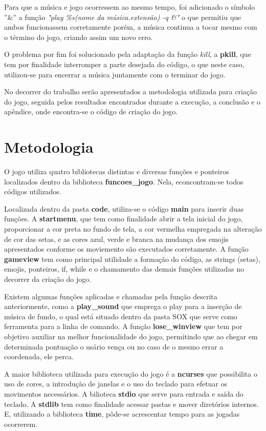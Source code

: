\documentclass[journal]{IEEEtran}
\begin{document}
Para que a música e jogo ocorressem ao mesmo tempo, foi adicionado o símbolo ''\&'' a função \textit{"play \%s(nome da música.extensão) -q \&"} o que permitiu que ambos funcionassem corretamente porém, a música continua a tocar mesmo com o término do jogo, criando assim um novo erro. 

O problema por fim foi solucionado pela adaptação da função \textit{kill}, a \textbf{pkill}, que tem por finalidade interromper a parte desejada do código, o que neste caso, utilizou-se para encerrar a música juntamente com o terminar do jogo. 

No decorrer do trabalho serão apresentados a metodologia utilizada para criação do jogo, seguida pelos resultados encontrados durante a execução, a conclusão e o apêndice, onde encontra-se o código de criação do jogo.


\section{Metodologia}
O jogo utiliza quatro bibliotecas distintas e diversas funções e ponteiros localizados dentro da biblioteca \textbf{funcoes\_jogo}. Nela, econcontram-se todos códigos utilizados. 

Localizada dentro da pasta \textbf{code}, utiliza-se o código \textbf{main} para inserir duas funções. A \textbf{startmenu}, que tem como finalidade abrir a tela inicial do jogo, proporcionar a cor preta no fundo de tela, a cor vermelha empregada na alteração de cor das setas, e as cores azul, verde e branca na mudança dos emojis apresentados conforme os moviemento são executados corretamente. A função \textbf{gameview} tem como principal utilidade a formação do código, as strings (setas), emojis, ponteiros, if, while e o chamamento das demais funções utilizadas no decorrer da criação do jogo. 

Existem algumas funções aplicadas e chamadas pela função descrita anteriormente, como a \textbf{play\_sound} que emprega o play para a inserção de música de fundo, o qual está situado dentro da pasta SOX que serve como ferramenta para a linha de comando. A função \textbf{lose\_winview} que tem por objetivo auxiliar na melhor funcionalidade do jogo, permitindo que ao chegar em determinada pontuação o usário vença ou no caso de o mesmo errar a coordenada, ele perca.

A maior biblioteca utilizada para execução do jogo é a \textbf{ncurses} que possibilita o uso de cores, a introdução de janelas e o uso do teclado para efetuar os movimentos necessários. A bilioteca \textbf{stdio} que serve para entrada e saída do teclado. A \textbf{stdlib} tem como finalidade acessar pastas e mover diretórios internos. E, utilizando a biblioteca \textbf{time}, pôde-se acrescentar tempo para as jogadas ocorrerem.
\end{document}

